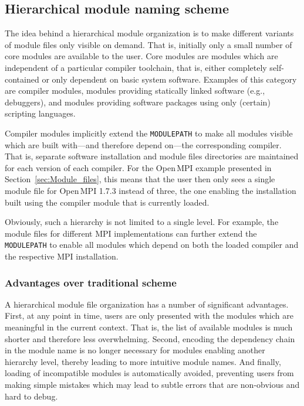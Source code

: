 

\subsection{Hierarchical module naming scheme}

The idea behind a hierarchical module organization is to make different
variants of module files only visible on demand. That is, initially only a
small number of core modules are available to the user. Core modules are
modules which are independent of a particular compiler toolchain, that is,
either completely self-contained or only dependent on basic system software.
Examples of this category are compiler modules, modules providing statically
linked software (e.g., debuggers), and modules providing software packages
using only (certain) scripting languages.

Compiler modules implicitly extend the \texttt{MODULEPATH} to make all
modules visible which are built with---and therefore depend on---the
corresponding compiler. That is, separate software installation and module
files directories are maintained for each version of each compiler. For the
Open\,MPI example presented in Section~\ref{sec:Module_files}, this means
that the user then only sees a single module file for Open\,MPI 1.7.3 instead
of three, the one enabling the installation built using the compiler module
that is currently loaded.

Obviously, such a hierarchy is not limited to a single level. For example,
the module files for different MPI implementations can further extend the
\texttt{MODULEPATH} to enable all modules which depend on both the loaded
compiler and the respective MPI installation.

\subsubsection{Advantages over traditional scheme}


A hierarchical module file organization has a number of significant
advantages. First, at any point in time, users are only presented with the
modules which are meaningful in the current context. That is, the list of
available modules is much shorter and therefore less overwhelming. Second,
encoding the dependency chain in the module name is no longer necessary for
modules enabling another hierarchy level, thereby leading to more intuitive
module names. And finally, loading of incompatible modules is automatically
avoided, preventing users from making simple mistakes which may lead to
subtle errors that are non-obvious and hard to debug.

